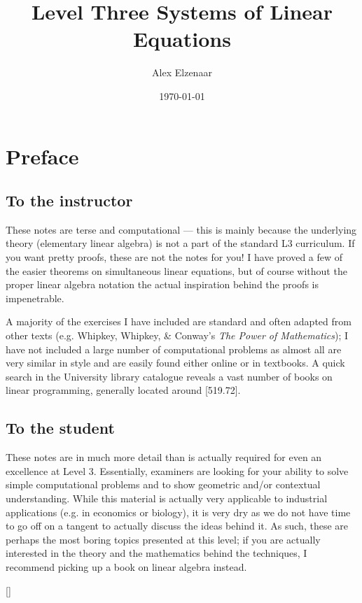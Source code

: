 \documentclass[a4paper,leqno]{article}
\title{Level Three Systems of Linear Equations}
\author{Alex Elzenaar}
\date{\today}
\numberwithin{equation}{section}
\theoremstyle{definition}
\theoremstyle{remark}
\begin{document}
\maketitle
\tableofcontents
\section*{Preface}
\subsection*{To the instructor}
These notes are terse and computational --- this is mainly because the underlying theory (elementary linear algebra) is not a part of the
standard L3 curriculum. If you want pretty proofs, these are not the notes for you! I have proved a few of the easier theorems on simultaneous
linear equations, but of course without the proper linear algebra notation the actual inspiration behind the proofs is impenetrable.

A majority of the exercises I have included are standard and often adapted from other texts (e.g. Whipkey, Whipkey, \& Conway's \textit{The Power
of Mathematics}); I have not included a large number of computational problems as almost all are very similar in style and are easily
found either online or in textbooks. A quick search in the University library catalogue reveals a vast number of books on linear programming,
generally located around [519.72].

\subsection*{To the student}
These notes are in much more detail than is actually required for even an excellence at Level 3. Essentially, examiners are looking for your
ability to solve simple computational problems and to show geometric and/or contextual understanding. While this material is actually very
applicable to industrial applications (e.g. in economics or biology), it is very dry as we do not have time to go off on a tangent to actually
discuss the ideas behind it. As such, these are perhaps the most boring topics presented at this level; if you are actually interested in the
theory and the mathematics behind the techniques, I recommend picking up a book on linear algebra instead.

[{\titlerule[0.8pt]}]
\let\oldsection\section
\renewcommand\section{\clearpage\oldsection}
\end{document}
